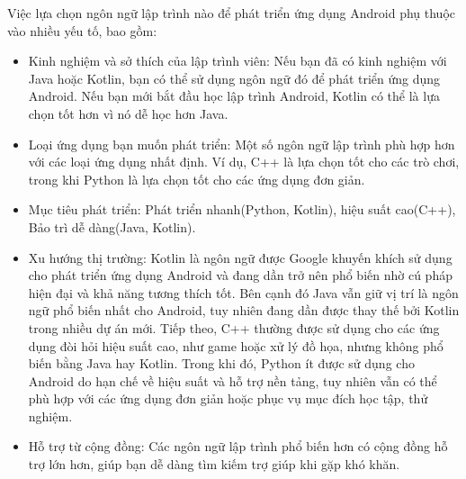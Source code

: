     \begin{flushleft}
        \hspace*{0.8cm}Việc lựa chọn ngôn ngữ lập trình nào để phát triển ứng dụng Android phụ thuộc vào nhiều yếu tố, bao gồm:
        \setlength{\leftmargini}{1.5cm}
        \begin{itemize}
            \item Kinh nghiệm và sở thích của lập trình viên: Nếu bạn đã có kinh nghiệm với Java hoặc Kotlin, bạn có thể sử dụng ngôn ngữ đó để phát triển ứng dụng Android. Nếu bạn mới bắt đầu học lập trình Android, Kotlin có thể là lựa chọn tốt hơn vì nó dễ học hơn Java.
            \item Loại ứng dụng bạn muốn phát triển: Một số ngôn ngữ lập trình phù hợp hơn với các loại ứng dụng nhất định. Ví dụ, C++ là lựa chọn tốt cho các trò chơi, trong khi Python là lựa chọn tốt cho các ứng dụng đơn giản.
            \item Mục tiêu phát triển: Phát triển nhanh(Python, Kotlin), hiệu suất cao(C++), Bảo trì dễ dàng(Java, Kotlin).
            \item Xu hướng thị trường: Kotlin là ngôn ngữ được Google khuyến khích sử dụng cho phát triển ứng dụng Android và đang dần trở nên phổ biến nhờ cú pháp hiện đại và khả năng tương thích tốt. Bên cạnh đó Java vẫn giữ vị trí là ngôn ngữ phổ biến nhất cho Android, tuy nhiên đang dần được thay thế bởi Kotlin trong nhiều dự án mới. Tiếp theo, C++ thường được sử dụng cho các ứng dụng đòi hỏi hiệu suất cao, như game hoặc xử lý đồ họa, nhưng không phổ biến bằng Java hay Kotlin. Trong khi đó, Python ít được sử dụng cho Android do hạn chế về hiệu suất và hỗ trợ nền tảng, tuy nhiên vẫn có thể phù hợp với các ứng dụng đơn giản hoặc phục vụ mục đích học tập, thử nghiệm.        
            \item Hỗ trợ từ cộng đồng: Các ngôn ngữ lập trình phổ biến hơn có cộng đồng hỗ trợ lớn hơn, giúp bạn dễ dàng tìm kiếm trợ giúp khi gặp khó khăn.   
        \end{itemize}
    \end{flushleft}

